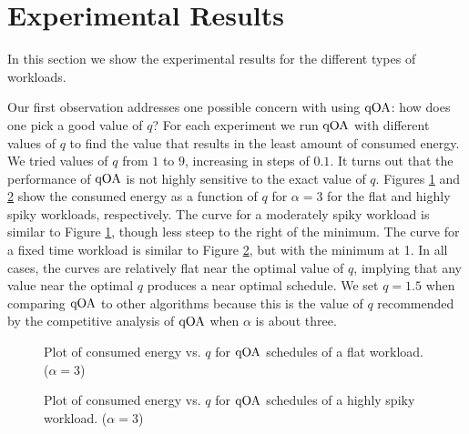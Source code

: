 \documentclass[11pt]{article}
\newcommand{\qOA}{{\rm qOA}}
\newcommand{\mycomment}[1]{ }
\begin{document}
\section{Experimental Results} 
\label{sec:results}

In this section we show the experimental results for the different
types of workloads. 

Our first observation addresses one possible concern with using $\qOA$:
how does one pick a good value of $q$?
For each experiment we run $\qOA$ with
different values of $q$ to find the value that results in the least
amount of consumed energy. We tried values of $q$ from $1$ to $9$,
increasing in steps of $0.1$.
It turns out that the performance of $\qOA$ is not highly
sensitive to the exact value of $q$.
Figures \ref{fig:q_Flat} and \ref{fig:q_High} show the consumed
energy as a function of $q$ for $\alpha = 3$ for the flat and
highly spiky workloads, respectively.
The curve for a moderately spiky workload is similar to Figure
\ref{fig:q_Flat}, though less steep to the right of the minimum.
The curve for a fixed time workload is similar to Figure
\ref{fig:q_High}, but with the minimum at 1.
In all cases, the curves are relatively flat near the optimal value of
$q$, implying that any value near the optimal $q$ produces a near
optimal schedule. We set $q=1.5$ when comparing $\qOA$ to other algorithms
because this is the value of $q$ recommended by the competitive analysis of
$\qOA$ when $\alpha$ is about three.

\begin{figure}
\centering
{}
\caption{Plot of consumed energy vs. $q$ for $\qOA$ schedules of a flat
  workload. ($\alpha=3$)}
\label{fig:q_Flat}
\end{figure}

\mycomment{
\begin{figure}
\centering
\epsfig{file=figs/q_moderate1.eps, scale=.6}
\caption{Plot of consumed energy vs. $q$ for $\qOA$ schedules of a
  moderately spiky workload. ($\alpha=3$)}
\label{fig:q_Moderate}
\end{figure}
}

\mycomment{
\begin{figure}
\centering
\epsfig{file=figs/q_fixed1.eps, scale=0.6}
\caption{Plot of consumed energy vs. $q$ for $\qOA$ schedules of a
  fixed time workload. ($\alpha=3$)}
\label{fig:q_Fixed}
\end{figure}
}

\begin{figure}
\centering
{}
\caption{Plot of consumed energy vs. $q$ for $\qOA$ schedules of a
  highly spiky workload. ($\alpha=3$)}
\label{fig:q_High}
\end{figure}
\end{document}
